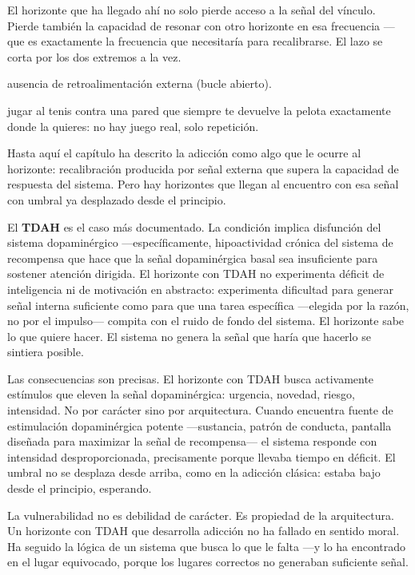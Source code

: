 El horizonte que ha llegado ahí no solo pierde acceso a la señal del vínculo. Pierde también la capacidad de resonar con otro horizonte en esa frecuencia —que es exactamente la frecuencia que necesitaría para recalibrarse. El lazo se corta por los dos extremos a la vez.

\begin{fisica}
 ausencia de retroalimentación externa (bucle abierto).

 jugar al tenis contra una pared que siempre te devuelve la pelota exactamente donde la quieres: no hay juego real, solo repetición.
\end{fisica}
\noindent Hasta aquí el capítulo ha descrito la adicción como algo que le ocurre al horizonte: recalibración producida por señal externa que supera la capacidad de respuesta del sistema. Pero hay horizontes que llegan al encuentro con esa señal con umbral ya desplazado desde el principio.

El \textbf{TDAH} es el caso más documentado. La condición implica disfunción del sistema dopaminérgico —específicamente, hipoactividad crónica del sistema de recompensa que hace que la señal dopaminérgica basal sea insuficiente para sostener atención dirigida. El horizonte con TDAH no experimenta déficit de inteligencia ni de motivación en abstracto: experimenta dificultad para generar señal interna suficiente como para que una tarea específica —elegida por la razón, no por el impulso— compita con el ruido de fondo del sistema. El horizonte sabe lo que quiere hacer. El sistema no genera la señal que haría que hacerlo se sintiera posible.

Las consecuencias son precisas. El horizonte con TDAH busca activamente estímulos que eleven la señal dopaminérgica: urgencia, novedad, riesgo, intensidad. No por carácter sino por arquitectura. Cuando encuentra fuente de estimulación dopaminérgica potente —sustancia, patrón de conducta, pantalla diseñada para maximizar la señal de recompensa— el sistema responde con intensidad desproporcionada, precisamente porque llevaba tiempo en déficit. El umbral no se desplaza desde arriba, como en la adicción clásica: estaba bajo desde el principio, esperando.

La vulnerabilidad no es debilidad de carácter. Es propiedad de la arquitectura. Un horizonte con TDAH que desarrolla adicción no ha fallado en sentido moral. Ha seguido la lógica de un sistema que busca lo que le falta —y lo ha encontrado en el lugar equivocado, porque los lugares correctos no generaban suficiente señal.

